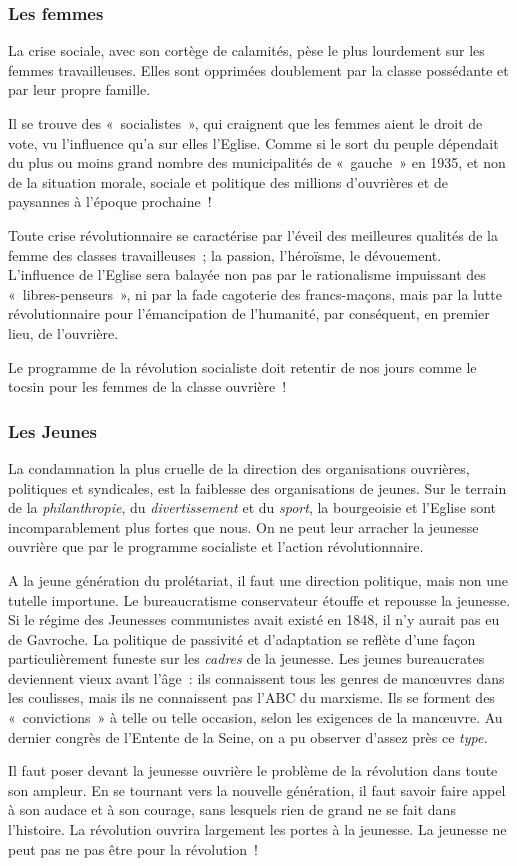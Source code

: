 \documentclass[french,twoside]{book} %
\begin{document}
\subsubsection[{Les femmes}]{Les femmes}
\noindent La crise sociale, avec son cortège de calamités, pèse le plus lourdement sur les femmes travailleuses. Elles sont opprimées doublement par la classe possédante et par leur propre famille.\par
Il se trouve des « socialistes », qui craignent que les femmes aient le droit de vote, vu l’influence qu’a sur elles l’Eglise. Comme si le sort du peuple dépendait du plus ou moins grand nombre des municipalités de « gauche » en 1935, et non de la situation morale, sociale  et politique des millions d’ouvrières et de paysannes à l’époque prochaine !\par
Toute crise révolutionnaire se caractérise par l’éveil des meilleures qualités de la femme des classes travailleuses ; la passion, l’héroïsme, le dévouement. L’influence de l’Eglise sera balayée non pas par le rationalisme impuissant des « libres-penseurs », ni par la fade cagoterie des francs-maçons, mais par la lutte révolutionnaire pour l’émancipation de l’humanité, par conséquent, en premier lieu, de l’ouvrière.\par
Le programme de la révolution socialiste doit retentir de nos jours comme le tocsin pour les femmes de la classe ouvrière !
\subsubsection[{Les Jeunes}]{Les Jeunes}
\noindent La condamnation la plus cruelle de la direction des organisations ouvrières, politiques et syndicales, est la faiblesse des organisations de jeunes. Sur le terrain de la \emph{philanthropie}, du \emph{divertissement} et du \emph{sport}, la bourgeoisie et l’Eglise sont incomparablement plus fortes que nous. On ne peut leur arracher la jeunesse ouvrière que par le programme socialiste et l’action révolutionnaire.\par
A la jeune génération du prolétariat, il faut une direction politique, mais non une tutelle importune. Le bureaucratisme conservateur étouffe et repousse la jeunesse. Si le régime des Jeunesses communistes avait existé en 1848, il n’y aurait pas eu de Gavroche. La politique de passivité et d’adaptation se reflète d’une façon particulièrement funeste sur les \emph{cadres} de la jeunesse. Les jeunes bureaucrates deviennent vieux avant l’âge : ils connaissent tous les genres de manœuvres dans les coulisses, mais ils ne connaissent pas l’ABC du marxisme. Ils se forment des « convictions » à telle ou telle occasion, selon les exigences de la manœuvre. Au dernier congrès de  l’Entente de la Seine, on a pu observer d’assez près ce \emph{type.}\par
Il faut poser devant la jeunesse ouvrière le problème de la révolution dans toute son ampleur. En se tournant vers la nouvelle génération, il faut savoir faire appel à son audace et à son courage, sans lesquels rien de grand ne se fait dans l’histoire. La révolution ouvrira largement les portes à la jeunesse. La jeunesse ne peut pas ne pas être pour la révolution !
\end{document}

